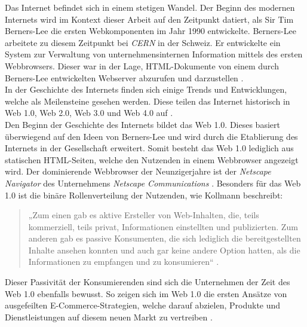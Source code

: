 \documentclass[a4paper]{scrartcl}
\begin{document}
Das Internet befindet sich in einem stetigen Wandel. Der Beginn des modernen Internets wird im Kontext dieser Arbeit auf den Zeitpunkt datiert, als Sir Tim Berners-Lee die ersten Webkomponenten im Jahr 1990 entwickelte. Berners-Lee arbeitete zu diesem Zeitpunkt bei \textit{CERN} in der Schweiz. Er entwickelte ein System zur Verwaltung von unternehmensinternen Information mittels des ersten Webbrowsers. Dieser war in der Lage, HTML-Dokumente von einem durch Berners-Lee entwickelten Webserver abzurufen und darzustellen \autocite{Berners-Lee}. \\
In der Geschichte des Internets finden sich einige Trends und Entwicklungen, welche als Meilensteine gesehen werden. Diese teilen das Internet historisch in Web 1.0, Web 2.0, Web 3.0 und Web 4.0 auf \autocite[133]{Kollmann}. \\
Den Beginn der Geschichte des Internets bildet das Web 1.0. Dieses basiert überwiegend auf den Ideen von Berners-Lee und wird durch die Etablierung des Internets in der Gesellschaft erweitert. Somit besteht das Web 1.0 lediglich aus statischen HTML-Seiten, welche den Nutzenden in einem Webbrowser angezeigt wird. Der dominierende Webbrowser der Neunzigerjahre ist der \textit{Netscape Navigator} des Unternehmens \textit{Netscape Communications} \autocite{Oreilly}. Besonders für das Web 1.0 ist die binäre Rollenverteilung der Nutzenden, wie Kollmann beschreibt:
\begin{quote}
	„Zum einen gab es aktive Ersteller von Web-Inhalten, die, teils kommerziell, teils privat, Informationen einstellten und publizierten. Zum anderen gab es passive Konsumenten, die sich lediglich die bereitgestellten Inhalte ansehen konnten und auch gar keine andere Option hatten, als die Informationen zu empfangen und zu konsumieren“ \autocite[134]{Kollmann}.
\end{quote}
Dieser Passivität der Konsumierenden sind sich die Unternehmen der Zeit des Web 1.0 ebenfalls bewusst. So zeigen sich im Web 1.0 die ersten Ansätze von ausgefeilten E-Commerce-Strategien, welche darauf abzielen, Produkte und Dienstleistungen auf diesem neuen Markt zu vertreiben \autocite[1204]{Kollmann_Lomberg}. \\
\end{document}
